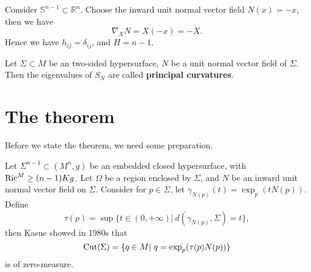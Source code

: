 \begin{eg}
    Consider $\mathbb{S}^{n-1}\subset\mathbb{R}^n$.
    Choose the inward unit normal vector field $N(x)=-x$, then we have
    \[\nabla_XN=X(-x)=-X.\]
    Hence we have $h_{ij}=\delta_{ij}$, and $H=n-1$.
\end{eg}

\begin{defn}
    Let $\Sigma\subset M$ be an two-sided hypersurface, $N$ be a unit normal vector field of $\Sigma$.
    Then the eigenvalues of $S_N$ are called \textbf{principal curvatures}.
\end{defn}

\section{The theorem}

Before we state the theorem, we need some preparation.

Let $\Sigma^{n-1}\subset(M^n,g)$ be an embedded closed hypersurface, with $\operatorname{Ric}^M\geq(n-1)Kg$.
Let $\Omega$ be a region enclosed by $\Sigma$, and $N$ be an inward unit normal vector field on $\Sigma$.
Consider for $p\in\Sigma$, let $\gamma_{N(p)}(t)=\exp_p(tN(p))$.
Define
\[\tau(p)=\sup\{t\in(0,+\infty)|\ d(\gamma_{N(p)},\Sigma)=t\},\]
then Kasue showed in 1980s that
\[\Cut(\Sigma)=\{q\in M|\ q=\exp_p(\tau(p)N(p))\}\]
is of zero-measure.


